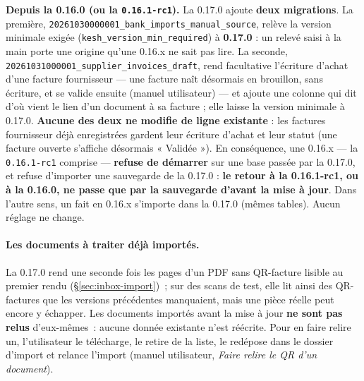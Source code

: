 \documentclass[a4paper,11pt,oneside]{article}
\begin{document}
\begin{sloppypar}
\textbf{Depuis la 0.16.0 (ou la \texttt{0.16.1-rc1}).} La 0.17.0 ajoute \textbf{deux migrations}. La première, \texttt{20261030000001\_bank\_imports\_manual\_source}, relève la version minimale exigée (\texttt{kesh\_version\_min\_required}) à \textbf{0.17.0} : un relevé saisi à la main porte une origine qu'une 0.16.x ne sait pas lire. La seconde, \texttt{20261031000001\_supplier\_invoices\_draft}, rend facultative l'écriture d'achat d'une facture fournisseur --- une facture naît désormais en brouillon, sans écriture, et se valide ensuite (manuel utilisateur) --- et ajoute une colonne qui dit d'où vient le lien d'un document à sa facture ; elle laisse la version minimale à 0.17.0. \textbf{Aucune des deux ne modifie de ligne existante} : les factures fournisseur déjà enregistrées gardent leur écriture d'achat et leur statut (une facture ouverte s'affiche désormais « Validée »). En conséquence, une 0.16.x --- la \texttt{0.16.1-rc1} comprise --- \textbf{refuse de démarrer} sur une base passée par la 0.17.0, et refuse d'importer une sauvegarde de la 0.17.0 : \textbf{le retour à la 0.16.1-rc1, ou à la 0.16.0, ne passe que par la sauvegarde d'avant la mise à jour}. Dans l'autre sens, un  fait en 0.16.x s'importe dans la 0.17.0 (mêmes tables). Aucun réglage ne change.
\end{sloppypar}

\paragraph{Les documents à traiter déjà importés.} La 0.17.0 rend une seconde fois les pages d'un PDF sans QR-facture lisible au premier rendu (\S\ref{sec:inbox-import})~; sur des scans de test, elle lit ainsi des QR-factures que les versions précédentes manquaient, mais une pièce réelle peut encore y échapper. Les documents importés avant la mise à jour \textbf{ne sont pas relus} d'eux-mêmes~: aucune donnée existante n'est réécrite. Pour en faire relire un, l'utilisateur le télécharge, le retire de la liste, le redépose dans le dossier d'import et relance l'import (manuel utilisateur, \emph{Faire relire le QR d'un document}).
\end{document}
